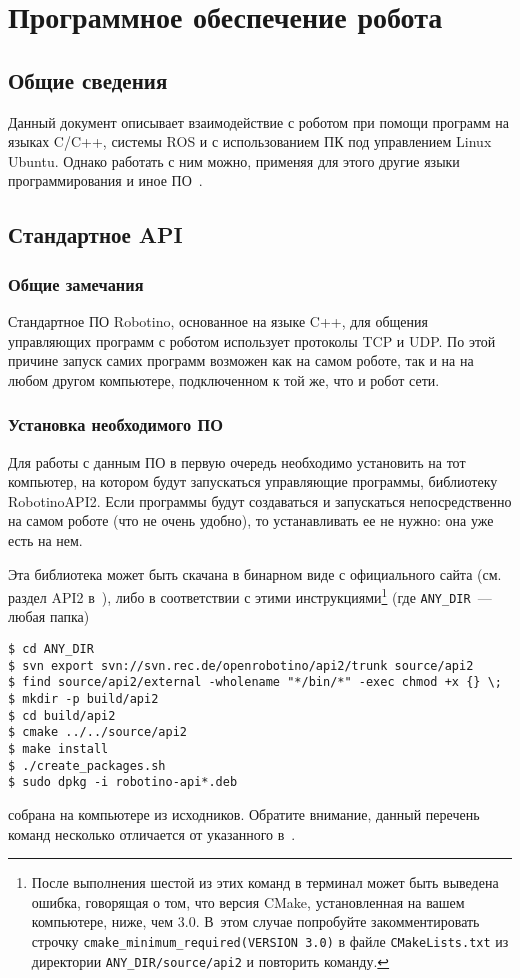 \chapter{Программное обеспечение робота}
\section{Общие сведения}
Данный документ описывает взаимодействие с роботом при помощи программ на языках C/C++, системы ROS и с использованием ПК под управлением Linux Ubuntu.
Однако работать с ним можно, применяя для этого другие языки программирования и иное ПО~\cite{wiki_openrobotino}.



\section{Стандартное API}
\subsection{Общие замечания}
Стандартное ПО Robotino, основанное на языке C++, для общения управляющих программ с роботом использует протоколы TCP и UDP.
По этой причине запуск самих программ возможен как на самом роботе, так и на на любом другом компьютере, подключенном к той же, что и робот сети.



\subsection{Установка необходимого ПО}\label{part_robotinoapi2_installation}
Для работы с данным ПО в первую очередь необходимо установить на тот компьютер, на котором будут запускаться управляющие программы, библиотеку RobotinoAPI2.
Если программы будут создаваться и запускаться непосредственно на самом роботе (что не очень удобно), то устанавливать ее не нужно: она уже есть на нем.

Эта библиотека может быть скачана в бинарном виде с официального сайта (см. раздел API2 в~\cite{downloads_page}), либо в соответствии с этими инструкциями\footnote{После выполнения шестой из этих команд в терминал может быть выведена ошибка, говорящая о том, что версия CMake, установленная на вашем компьютере, ниже, чем 3.0. В~этом случае попробуйте закомментировать строчку \texttt{cmake\_minimum\_required(VERSION 3.0)} в файле \texttt{CMakeLists.txt} из директории \texttt{ANY\_DIR/source/api2} и повторить команду.} (где \texttt{ANY\_DIR}~--- любая папка)
\begin{lstlisting}[style=bash_commands]
$ cd ANY_DIR
$ svn export svn://svn.rec.de/openrobotino/api2/trunk source/api2
$ find source/api2/external -wholename "*/bin/*" -exec chmod +x {} \;
$ mkdir -p build/api2
$ cd build/api2
$ cmake ../../source/api2
$ make install
$ ./create_packages.sh
$ sudo dpkg -i robotino-api*.deb
\end{lstlisting}
собрана на компьютере из исходников.
Обратите внимание, данный перечень команд несколько отличается от указанного в~\cite{api2_source_build}.



